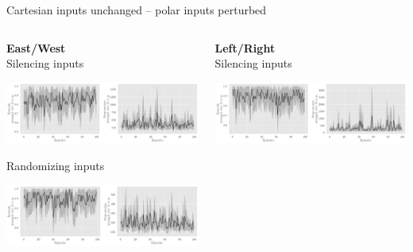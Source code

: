 \documentclass[bigger]{beamer}
\begin{document}
\begin{frame}[label={sec:org2846752}]{Cartesian inputs unchanged -- polar inputs perturbed}
\begin{columns}
\begin{column}[c]{0.5\columnwidth}
\begin{center}
\small
\textbf{East/West}\\
\footnotesize
Silencing inputs
\end{center}
\begin{center}
\includegraphics[width=\textwidth]{medias/EastWest/exp_keep-cartesian_silence-True.png}
\end{center}
\begin{center}
\footnotesize
Randomizing inputs
\end{center}
\begin{center}
\includegraphics[width=\textwidth]{medias/EastWest/exp_keep-cartesian_silence-False.png}
\end{center}
\end{column}
\begin{column}[c]{0.5\columnwidth}
\begin{center}
\small
\textbf{Left/Right}\\
\footnotesize
Silencing inputs
\end{center}
\begin{center}
\includegraphics[width=\textwidth]{medias/LeftRight/exp_keep-cartesian_silence-True.png}

\end{center}
\end{column}
\end{columns}
\end{frame}
\end{document}

